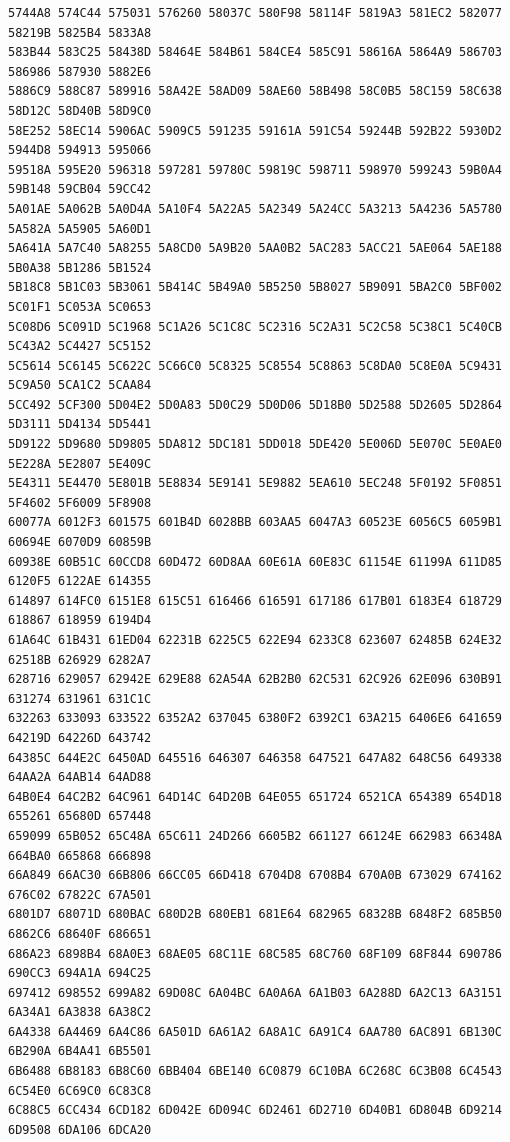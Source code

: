 \documentclass[11pt]{amsart}
\theoremstyle{remark}
\begin{document}
{\begin{verbatim}
5744A8 574C44 575031 576260 58037C 580F98 58114F 5819A3 581EC2 582077 58219B 5825B4 5833A8
583B44 583C25 58438D 58464E 584B61 584CE4 585C91 58616A 5864A9 586703 586986 587930 5882E6
5886C9 588C87 589916 58A42E 58AD09 58AE60 58B498 58C0B5 58C159 58C638 58D12C 58D40B 58D9C0
58E252 58EC14 5906AC 5909C5 591235 59161A 591C54 59244B 592B22 5930D2 5944D8 594913 595066
59518A 595E20 596318 597281 59780C 59819C 598711 598970 599243 59B0A4 59B148 59CB04 59CC42
5A01AE 5A062B 5A0D4A 5A10F4 5A22A5 5A2349 5A24CC 5A3213 5A4236 5A5780 5A582A 5A5905 5A60D1
5A641A 5A7C40 5A8255 5A8CD0 5A9B20 5AA0B2 5AC283 5ACC21 5AE064 5AE188 5B0A38 5B1286 5B1524
5B18C8 5B1C03 5B3061 5B414C 5B49A0 5B5250 5B8027 5B9091 5BA2C0 5BF002 5C01F1 5C053A 5C0653
5C08D6 5C091D 5C1968 5C1A26 5C1C8C 5C2316 5C2A31 5C2C58 5C38C1 5C40CB 5C43A2 5C4427 5C5152
5C5614 5C6145 5C622C 5C66C0 5C8325 5C8554 5C8863 5C8DA0 5C8E0A 5C9431 5C9A50 5CA1C2 5CAA84
5CC492 5CF300 5D04E2 5D0A83 5D0C29 5D0D06 5D18B0 5D2588 5D2605 5D2864 5D3111 5D4134 5D5441
5D9122 5D9680 5D9805 5DA812 5DC181 5DD018 5DE420 5E006D 5E070C 5E0AE0 5E228A 5E2807 5E409C
5E4311 5E4470 5E801B 5E8834 5E9141 5E9882 5EA610 5EC248 5F0192 5F0851 5F4602 5F6009 5F8908
60077A 6012F3 601575 601B4D 6028BB 603AA5 6047A3 60523E 6056C5 6059B1 60694E 6070D9 60859B
60938E 60B51C 60CCD8 60D472 60D8AA 60E61A 60E83C 61154E 61199A 611D85 6120F5 6122AE 614355
614897 614FC0 6151E8 615C51 616466 616591 617186 617B01 6183E4 618729 618867 618959 6194D4
61A64C 61B431 61ED04 62231B 6225C5 622E94 6233C8 623607 62485B 624E32 62518B 626929 6282A7
628716 629057 62942E 629E88 62A54A 62B2B0 62C531 62C926 62E096 630B91 631274 631961 631C1C
632263 633093 633522 6352A2 637045 6380F2 6392C1 63A215 6406E6 641659 64219D 64226D 643742
64385C 644E2C 6450AD 645516 646307 646358 647521 647A82 648C56 649338 64AA2A 64AB14 64AD88
64B0E4 64C2B2 64C961 64D14C 64D20B 64E055 651724 6521CA 654389 654D18 655261 65680D 657448
659099 65B052 65C48A 65C611 24D266 6605B2 661127 66124E 662983 66348A 664BA0 665868 666898
66A849 66AC30 66B806 66CC05 66D418 6704D8 6708B4 670A0B 673029 674162 676C02 67822C 67A501
6801D7 68071D 680BAC 680D2B 680EB1 681E64 682965 68328B 6848F2 685B50 6862C6 68640F 686651
686A23 6898B4 68A0E3 68AE05 68C11E 68C585 68C760 68F109 68F844 690786 690CC3 694A1A 694C25
697412 698552 699A82 69D08C 6A04BC 6A0A6A 6A1B03 6A288D 6A2C13 6A3151 6A34A1 6A3838 6A38C2
6A4338 6A4469 6A4C86 6A501D 6A61A2 6A8A1C 6A91C4 6AA780 6AC891 6B130C 6B290A 6B4A41 6B5501
6B6488 6B8183 6B8C60 6BB404 6BE140 6C0879 6C10BA 6C268C 6C3B08 6C4543 6C54E0 6C69C0 6C83C8
6C88C5 6CC434 6CD182 6D042E 6D094C 6D2461 6D2710 6D40B1 6D804B 6D9214 6D9508 6DA106 6DCA20

\end{verbatim}}
\end{document}
